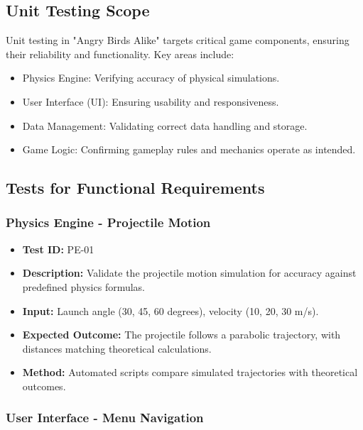 \documentclass[12pt]{article}
\begin{document}
\subsection{Unit Testing Scope}

Unit testing in "Angry Birds Alike" targets critical game components, ensuring their reliability and functionality. Key areas include:

\begin{itemize}
    \item Physics Engine: Verifying accuracy of physical simulations.
    \item User Interface (UI): Ensuring usability and responsiveness.
    \item Data Management: Validating correct data handling and storage.
    \item Game Logic: Confirming gameplay rules and mechanics operate as intended.
\end{itemize}

\subsection{Tests for Functional Requirements}

\subsubsection{Physics Engine - Projectile Motion}

\begin{itemize}
    \item \textbf{Test ID:} PE-01
    \item \textbf{Description:} Validate the projectile motion simulation for accuracy against predefined physics formulas.
    \item \textbf{Input:} Launch angle (30, 45, 60 degrees), velocity (10, 20, 30 m/s).
    \item \textbf{Expected Outcome:} The projectile follows a parabolic trajectory, with distances matching theoretical calculations.
    \item \textbf{Method:} Automated scripts compare simulated trajectories with theoretical outcomes.
\end{itemize}

\subsubsection{User Interface - Menu Navigation}
\end{document}
